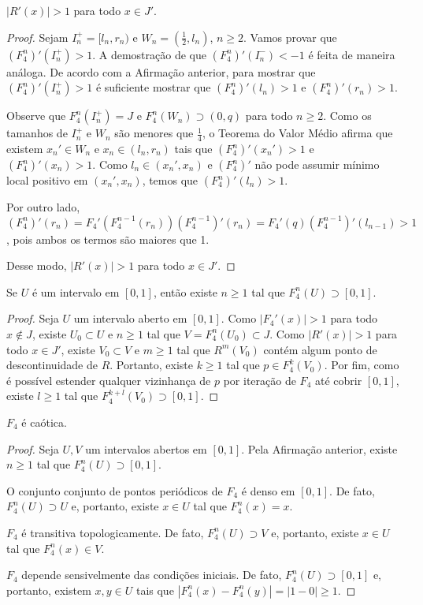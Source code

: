 \begin{affirmation}
$|R'(x)| > 1$ para todo $x \in J'$.
\end{affirmation}

\begin{proof}
Sejam $I^+_n = [l_n, r_n)$ e $W_n = (\frac{1}{2}, l_n)$, $n \geq 2$. Vamos provar que $(F^n_4)'(I_n^+) > 1$. A demostração de que $(F_4^n)'(I^-_n) < -1$ é feita de maneira análoga. De acordo com a Afirmação anterior, para mostrar que $(F_4^n)'(I^+_n) > 1$ é suficiente mostrar que $(F_4^n)'(l_n) > 1$ e $(F_4^n)'(r_n) > 1$.

Observe que $F_4^n(I^+_n) = J$ e $F_4^n(W_n) \supset (0,q)$ para todo $n \geq 2$. Como os tamanhos de $I^+_n$ e $W_n$ são menores que $\frac{1}{4}$, o Teorema do Valor Médio afirma que existem $x_n' \in W_n$ e $x_n \in (l_n, r_n)$ tais que $(F_4^n)'(x_n') > 1$ e $(F_4^n)'(x_n) > 1$. Como $l_n \in (x_n', x_n)$ e $(F_4^n)'$ não pode assumir mínimo local positivo em $(x_n',x_n)$, temos que $(F_4^n)'(l_n) > 1$.

Por outro lado, $(F_4^n)'(r_n) = F_4'(F_4^{n-1}(r_n)) (F_4^{n-1})'(r_n) =  F_4'(q) (F_4^{n-1})'(l_{n-1}) > 1$, pois ambos os termos são maiores que 1.

Desse modo, $|R'(x)| > 1$ para todo $x \in J'$.
\end{proof}

\begin{affirmation}
Se $U$ é um intervalo em $[0, 1]$, então existe $n \geq 1$ tal que $F_4^n(U) \supset [0, 1]$.
\end{affirmation}

\begin{proof}
Seja $U$ um intervalo aberto em $[0,1]$. Como $|F_4'(x)| > 1$ para todo $x \notin J$, existe $U_0 \subset U$ e $n \geq 1$ tal que $V = F_4^n(U_0) \subset J$. Como $|R'(x)| > 1$ para todo $x \in J'$, existe $V_0 \subset V$ e $m \geq 1$ tal que $R^m(V_0)$ contém algum ponto de descontinuidade de $R$. Portanto, existe $k \geq 1$ tal que $p \in F_4^k(V_0)$. Por fim, 
como é possível estender qualquer vizinhança de $p$ por iteração de $F_4$ até cobrir $[0,1]$, existe $l \geq 1$ tal que $F_4^{k+l}(V_0) \supset [0,1]$.
\end{proof}

\begin{affirmation}
$F_4$ é caótica.
\end{affirmation}

\begin{proof}
Seja $U, V$ um intervalos abertos em $[0,1]$. Pela Afirmação anterior, existe $n \geq 1$ tal que $F_4^n(U) \supset [0, 1]$.

O conjunto conjunto de pontos periódicos de $F_4$ é denso em $[0, 1]$. De fato, $F_4^n(U) \supset U$ e, portanto, existe $x \in U$ tal que $F_4^n(x) = x$.

$F_4$ é transitiva topologicamente. De fato, $F_4^n(U) \supset V$ e, portanto, existe $x \in U$ tal que $F_4^n(x) \in V$.

$F_4$ depende sensivelmente das condições iniciais. De fato, $F_4^n(U) \supset [0, 1]$ e, portanto, existem $x, y \in U$ tais que $|F_4^n(x) - F_4^n(y)| = |1 - 0| \geq 1$.
\end{proof}
